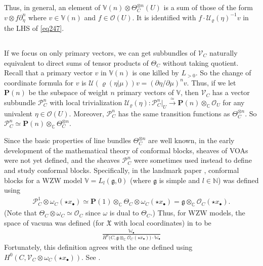 \documentclass[12pt,a4paper,notitlepage]{article}
\theoremstyle{definition}
\theoremstyle{plain}
\newcommand{\fk}{\mathfrak}
\newcommand{\mc}{\mathcal}
\newcommand{\scr}{\mathscr}
\newcommand{\gk}{\mathfrak g}
\newcommand{\mbf}{\mathbf}
\newcommand{\blt}{\bullet}
\newcommand{\Vbb}{\mathbb V}
\newcommand{\Wbb}{\mathbb W}
\newcommand{\Cbb}{\mathbb C}
\newcommand{\Nbb}{\mathbb N}
\numberwithin{equation}{section}
\begin{document}
Thus, in general, an element of $\Vbb(n)\otimes\Theta_C^{\otimes n}(U)$ is a sum of those of the form $v\otimes f\partial_\eta^n$ where $v\in\Vbb(n)$ and $f\in\scr O(U)$. It is identified with $f\cdot \mc U_\varrho(\eta)^{-1}v$ in the LHS of \eqref{eq247}.

\subsection{}

If we focus on only primary vectors, we can get subbundles of $\scr V_C$ naturally equivalent to direct sums of tensor products of $\Theta_C$ without taking quotient. Recall that a primary vector $v$ in $\Vbb(n)$ is  one killed by $L_{>0}$.  So the change of coordinate formula for $v$ is $\mc U(\varrho(\eta|\mu))v=(\partial\eta/\partial\mu)^nv$. Thus, if we let $\mbf P(n)$ be the subspace of weight $n$ primary vectors of $\Vbb$, then $\scr V_C$ has a vector subbundle $\scr P^n_C$ with local trivialization $\mc U_\varrho(\eta):\scr P^n_C|_U\xrightarrow{\simeq} \mbf P(n)\otimes_\Cbb\scr O_U$ for any univalent $\eta\in\scr O(U)$. Moreover, $\scr P_C^n$ has the same transition functions as $\Theta_C^{\otimes n}$. So $\scr P_C^n\simeq \mbf P(n)\otimes_\Cbb\Theta_C^{\otimes n}$.





Since the basic properties of line bundles $\Theta_C^{\otimes n}$ are well known, in the early development of the mathematical theory of conformal blocks, sheaves of VOAs were not yet defined, and the sheaves $\scr P^n_C$ were sometimes used instead to define and study conformal blocks. Specifically, in the landmark paper \cite{TUY89}, conformal blocks for a WZW model $\Vbb=L_l(\gk,0)$ (where $\gk$ is simple and $l\in\Nbb$) was defined using
\begin{align*}
\scr P^1_C\otimes \omega_C(\star x_\blt)\simeq\mbf P(1)\otimes_\Cbb \Theta_C\otimes\omega_C(\star x_\blt)=\gk\otimes_\Cbb\scr O_C(\star x_\blt).
\end{align*}
(Note that $\Theta_C\otimes\omega_C\simeq\scr O_C$ since $\omega$ is dual to $\Theta_C$.) Thus, for WZW models, the space of vacuua was defined (for $\fk X$ with local coordinates) in \cite{TUY89} to be
\begin{align*}
\frac{\Wbb_\blt}{H^0\big(C,\gk\otimes_\Cbb\scr O_C(\star x_\blt)\big)\cdot\Wbb_\blt}
\end{align*}
Fortunately, this definition agrees with the one defined using $H^0(C,\scr V_C\otimes\omega_C(\star x_\blt))$. See \cite[Sec. 9.3]{FB04}.
\end{document}
